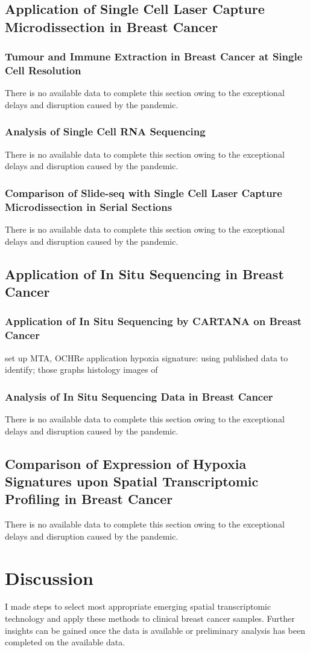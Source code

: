\subsection{Application of Single Cell Laser Capture Microdissection in Breast Cancer}
\subsubsection{Tumour and Immune Extraction in Breast Cancer at Single Cell Resolution}
There is no available data to complete this section owing to the exceptional delays and disruption caused by the pandemic. 

\subsubsection{Analysis of Single Cell RNA Sequencing}
There is no available data to complete this section owing to the exceptional delays and disruption caused by the pandemic. 

\subsubsection{Comparison of Slide-seq with Single Cell Laser Capture Microdissection in Serial Sections}
There is no available data to complete this section owing to the exceptional delays and disruption caused by the pandemic. 

\subsection{Application of In Situ Sequencing in Breast Cancer}
\subsubsection{Application of In Situ Sequencing by CARTANA on Breast Cancer}
set up MTA, OCHRe application
hypoxia signature: using published data to identify; those graphs
histology images of 

\subsubsection{Analysis of In Situ Sequencing Data in Breast Cancer}
There is no available data to complete this section owing to the exceptional delays and disruption caused by the pandemic. 

\subsection{Comparison of Expression of Hypoxia Signatures upon Spatial Transcriptomic Profiling in Breast Cancer}
There is no available data to complete this section owing to the exceptional delays and disruption caused by the pandemic. 

\section{Discussion}
I made steps to select most appropriate emerging spatial transcriptomic technology and apply these methods to clinical breast cancer samples. 
Further insights can be gained once the data is available or preliminary analysis has been completed on the available data.


